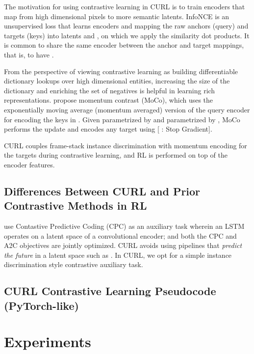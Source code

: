 \documentclass{article}
\begin{document}
The motivation for using contrastive learning in CURL is to train encoders that map from high dimensional pixels to more semantic latents. InfoNCE is an unsupervised loss that learns encoders  and  mapping the raw anchors (query)  and targets (keys)  into latents  and , on which we apply the similarity dot products. It is common to share the same encoder between the anchor and target mappings, that is, to have  \cite{oord2018representation, henaff2019data}. 

From the perspective of viewing contrastive learning as building differentiable dictionary lookups over high dimensional entities, increasing the size of the dictionary and enriching the set of negatives is helpful in learning rich representations. \citet{he2019momentum} propose momentum contrast (MoCo), which uses the exponentially moving average (momentum averaged) version of the query encoder  for encoding the keys in . Given  parametrized by  and  parametrized by , MoCo performs the update  and encodes any target  using  [ : Stop Gradient].

CURL couples frame-stack instance discrimination with momentum encoding for the targets during contrastive learning, and RL is performed on top of the encoder features. 


\subsection{Differences Between CURL and Prior Contrastive Methods in RL}

\citet{oord2018representation} use Contastive Predictive Coding (CPC) as an auxiliary task wherein an LSTM operates on a latent space of a convolutional encoder; and both the CPC and A2C \cite{mnih2015human} objectives are jointly optimized. CURL avoids using pipelines that {\it predict the future} in a latent space such as \citet{oord2018representation, hafner2019dream}. In CURL, we opt for a simple instance discrimination style contrastive auxiliary task. 

\subsection{CURL Contrastive Learning Pseudocode (PyTorch-like)}\label{pytorch}




 \section{Experiments}
\end{document}
